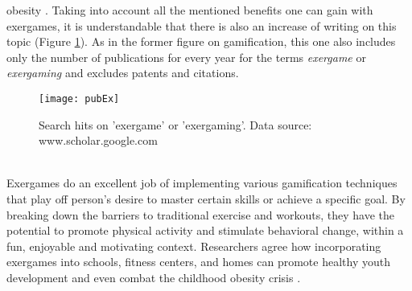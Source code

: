 obesity \cite{taylor2015use, barry2014rol, webster2014systematic}.
Taking into account all the mentioned benefits one can gain with exergames, it is understandable that there is also an increase of writing on this topic (Figure \ref{fig:pubEx}). As in the former figure on gamification, this one also includes only the number of publications for every year for the terms \textit{exergame} or \textit{exergaming} and excludes patents and citations. \\
\begin{figure}[h]
    \centering
    \texttt{[image: pubEx]}
    \caption{Search hits on 'exergame' or 'exergaming'. Data source: www.scholar.google.com}
    \label{fig:pubEx}
\end{figure}\\
Exergames do an excellent job of implementing various gamification techniques that play off person's desire to master certain skills or achieve a specific goal. By breaking down the barriers to traditional exercise and workouts, they have the potential to promote physical activity and stimulate behavioral change, within a fun, enjoyable and motivating context. Researchers agree how incorporating exergames into schools, fitness centers, and homes can promote healthy youth development and even combat the childhood obesity crisis \cite{staiano2011exergames}.

